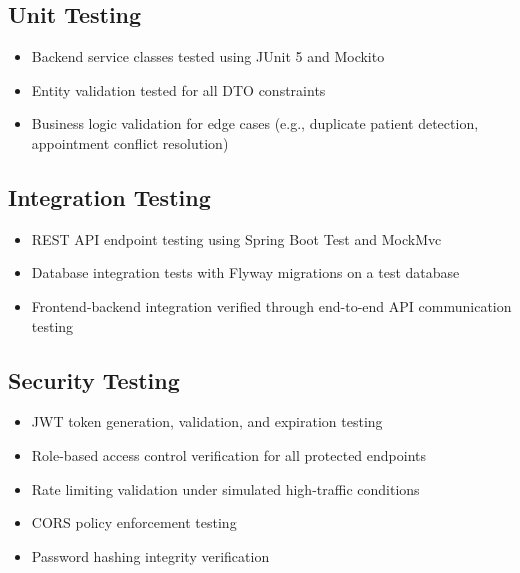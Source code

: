 \documentclass[conference]{IEEEtran}
\begin{document}
\subsection{Unit Testing}
\begin{itemize}[leftmargin=*]
  \item Backend service classes tested using JUnit 5 and Mockito
  \item Entity validation tested for all DTO constraints
  \item Business logic validation for edge cases (e.g., duplicate patient detection, appointment conflict resolution)
\end{itemize}

\subsection{Integration Testing}
\begin{itemize}[leftmargin=*]
  \item REST API endpoint testing using Spring Boot Test and MockMvc
  \item Database integration tests with Flyway migrations on a test database
  \item Frontend-backend integration verified through end-to-end API communication testing
\end{itemize}

\subsection{Security Testing}
\begin{itemize}[leftmargin=*]
  \item JWT token generation, validation, and expiration testing
  \item Role-based access control verification for all protected endpoints
  \item Rate limiting validation under simulated high-traffic conditions
  \item CORS policy enforcement testing
  \item Password hashing integrity verification
\end{itemize}
\end{document}
